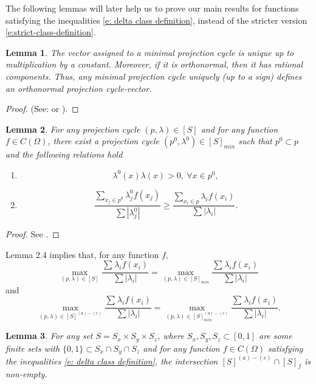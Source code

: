 \documentclass[12p]{article}
\numberwithin{equation}{section}
\newtheorem{lemma}{Lemma}[section]
\begin{document}
The following lemmas will later help us to prove our main results for functions satisfying the inequalities \eqref{e: delta class definition}, instead of the stricter version \eqref{e:strict-class-definition}.
\begin{lemma}
    The vector assigned to a minimal projection cycle is unique up to multiplication by a constant. Moreover, if it is orthonormal, then it has rational components.
    Thus, any minimal projection cycle uniquely (up to a sign) defines an orthonormal projection cycle-vector.
\end{lemma}
\begin{proof}
    (See: \cite[Lemma 4 and Lemma 5]{Navada} or \cite[Lemma 3.32]{Ismailov_2021}).
\end{proof}
\begin{lemma}
    For any projection cycle \((p,\lambda) \in [S]\) and for any function \(f\in C(\Omega)\), there exist a projection cycle \((p^0,\lambda^0) \in [S]_{min}\) such that \(p^0 \subset p\) and the following relations hold
    \begin{enumerate}
        \item \[\lambda^0(x)\lambda(x)>0, \ \forall x \in p^0, \]
        \item \[\frac{\sum_{x_j \in p^0}\lambda^0_jf(x_j)}{\sum|\lambda^0_j|} \ge \frac{\sum_{x_i \in p}\lambda_if(x_i)}{\sum|\lambda_i|}.\]
    \end{enumerate}
\end{lemma}
\begin{proof}
    See \cite[Theorem 2]{Navada}.
\end{proof}
Lemma 2.4 implies that, for any function \(f\),
\[
\max_{(p,\lambda)\in [S]} \frac{\sum_{}\lambda_if(x_i)}{\sum|\lambda_i|}=\max_{(p,\lambda)\in [S]_{min}} \frac{\sum_{}\lambda_if(x_i)}{\sum|\lambda_i|}
\]
and
\[
\max_{(p,\lambda)\in [S]^{(a)-(e)}} \frac{\sum_{}\lambda_if(x_i)}{\sum|\lambda_i|}=\max_{(p,\lambda)\in [S]^{(a)-(e)}_{min}} \frac{\sum_{}\lambda_if(x_i)}{\sum|\lambda_i|}.
\]
\begin{lemma} 
    For any set \(S=S_x\times S_y\times S_z\), where \(S_x,S_y,S_z \subset [0,1]\) are some finite sets with \(\{0,1\}\subset S_x \cap S_y \cap S_z\) and for any function \(f \in C(\Omega)\) satisfying the inequalities \eqref{e: delta class definition}, the intersection \([S]^{(a)-(e)} \cap [S]_f\) is non-empty. 
\end{lemma}
\end{document}
